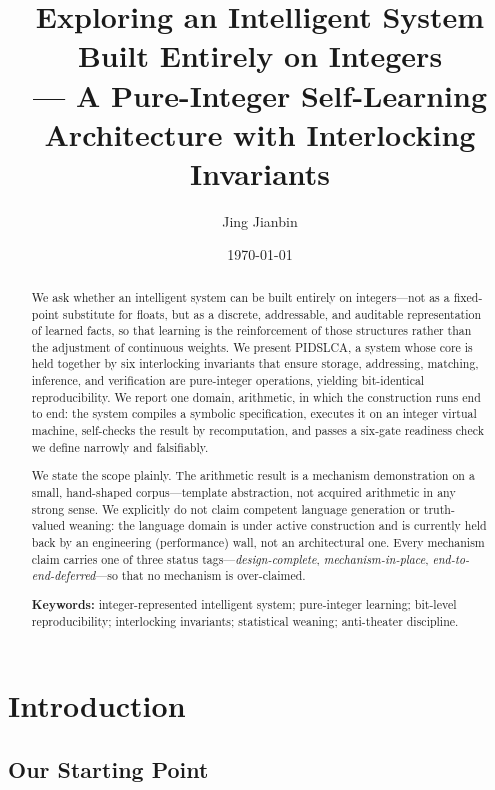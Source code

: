 \documentclass[11pt,a4paper]{article}
\title{Exploring an Intelligent System Built Entirely on Integers\\
       \large \sysname{} --- A Pure-Integer Self-Learning Architecture
       with Interlocking Invariants}
\author{Jing Jianbin}
\date{\today}
\newcommand{\sysname}{PIDSLCA}
\begin{document}
\maketitle

\begin{abstract}
We ask whether an intelligent system can be built entirely on
integers---not as a fixed-point substitute for floats, but as a
discrete, addressable, and auditable representation of learned facts,
so that learning is the reinforcement of those structures rather than
the adjustment of continuous weights. We present \sysname, a system
whose core is held together by six interlocking invariants that ensure
storage, addressing, matching, inference, and verification are
pure-integer operations, yielding bit-identical reproducibility. We
report one domain, arithmetic, in which the construction runs end to
end: the system compiles a symbolic specification, executes it on an
integer virtual machine, self-checks the result by recomputation, and
passes a six-gate readiness check we define narrowly and falsifiably.

We state the scope plainly. The arithmetic result is a mechanism
demonstration on a small, hand-shaped corpus---template abstraction, not
acquired arithmetic in any strong sense. We explicitly do not claim
competent language generation or truth-valued weaning: the language
domain is under active construction and is currently held back by an
engineering (performance) wall, not an architectural one. Every
mechanism claim carries one of three status tags---\textit{design-complete},
\textit{mechanism-in-place}, \textit{end-to-end-deferred}---so that no
mechanism is over-claimed.

\medskip\noindent\textbf{Keywords:} integer-represented intelligent
system; pure-integer learning; bit-level reproducibility; interlocking
invariants; statistical weaning; anti-theater discipline.
\end{abstract}

\section{Introduction}
\label{sec:intro}

\subsection{Our Starting Point}
\label{sec:intro-start}
\end{document}
